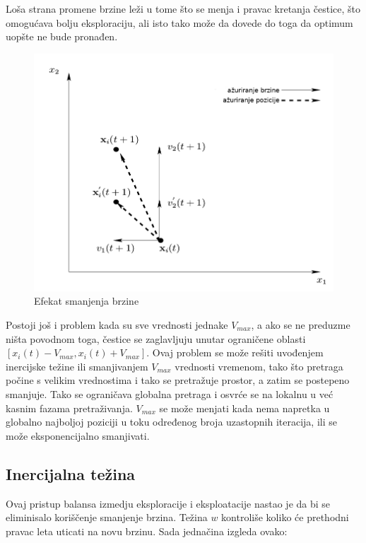 \documentclass[a4paper]{article}
\begin{document}
Loša strana promene brzine leži u tome što se menja i pravac kretanja čestice, što omogućava bolju eksploraciju, ali isto tako može da dovede do toga da optimum uopšte ne bude pronađen.

\begin{figure}[htp]
    \centering
    \includegraphics[scale=0.3]{slika3_1.png}
    \caption{Efekat smanjenja brzine}
    \label{fig:smanjenje_brzina}
\end{figure}

Postoji još i problem kada su sve vrednosti jednake $V_{max}$, a ako se ne preduzme ništa povodnom toga, čestice se zaglavljuju unutar ograničene oblasti $[x_i(t)-V_{max} , x_i(t) + V_{max} ]$.  Ovaj problem se može rešiti uvođenjem inercijske težine ili smanjivanjem  $V_{max}$ vrednosti vremenom, tako što pretraga počine s velikim vrednostima i tako se pretražuje prostor, a zatim se postepeno smanjuje. Tako se ograničava globalna pretraga i osvrće se na lokalnu u već kasnim fazama pretraživanja. $V_{max}$ se može menjati kada nema napretka u globalno najboljoj poziciji u toku određenog broja uzastopnih iteracija, ili se može eksponencijalno smanjivati.

\subsection{Inercijalna težina}
Ovaj pristup balansa izmedju eksploracije i eksploatacije nastao je da bi se eliminisalo koriščenje smanjenje brzina. Težina $w$  kontroliše koliko će prethodni pravac leta uticati na novu brzinu. Sada jednačina izgleda ovako:
\end{document}
